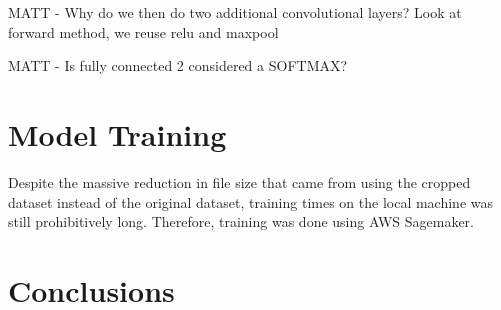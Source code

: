 \documentclass{article}
\begin{document}
MATT - Why do we then do two additional convolutional layers?
Look at forward method, we reuse relu and maxpool

MATT - Is fully connected 2 considered a SOFTMAX? 

\section{Model Training}

Despite the massive reduction in file size that came from using the cropped dataset instead of the original dataset, training times on the local machine was still prohibitively long. Therefore, training was done using AWS Sagemaker.


\section{Conclusions}



\end{document}
